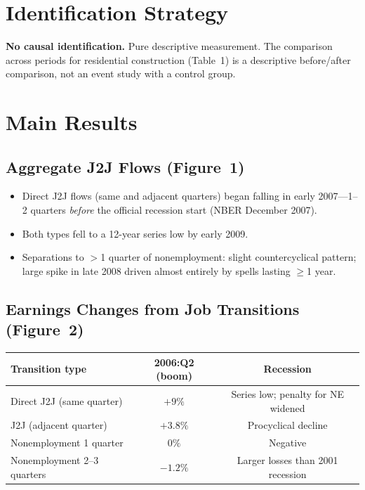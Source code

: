 \section{Identification Strategy}

\textbf{No causal identification.} Pure descriptive measurement. The
comparison across periods for residential construction (Table~1) is a
descriptive before/after comparison, not an event study with a control group.

\section{Main Results}

\subsection*{Aggregate J2J Flows (Figure~1)}

\begin{itemize}
  \item Direct J2J flows (same and adjacent quarters) began falling in early
    2007---1--2 quarters \emph{before} the official recession start (NBER
    December 2007).
  \item Both types fell to a 12-year series low by early 2009.
  \item Separations to $>$1 quarter of nonemployment: slight countercyclical
    pattern; large spike in late 2008 driven almost entirely by spells lasting
    $\geq$1 year.
\end{itemize}

\subsection*{Earnings Changes from Job Transitions (Figure~2)}

\begin{center}
\small
\begin{tabular}{lcc}
\toprule
\textbf{Transition type} & \textbf{2006:Q2 (boom)} & \textbf{Recession} \\
\midrule
Direct J2J (same quarter) & $+9\%$ & Series low; penalty for NE widened \\
J2J (adjacent quarter) & $+3.8\%$ & Procyclical decline \\
Nonemployment 1 quarter & $0\%$ & Negative \\
Nonemployment 2--3 quarters & $-1.2\%$ & Larger losses than 2001 recession \\
\bottomrule
\end{tabular}
\end{center}

